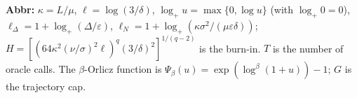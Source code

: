\begin{table}[tp]
\begin{threeparttable}
\begin{tablenotes}[flushleft]
\item[] \textbf{Abbr:} $\kappa=L/\mu$, $\ell=\log(3/\delta)$, $\log_+u=\max\{0,\log u\}$ (with $\log_+0=0$), $\ell_\Delta=1+\log_+(\Delta/\varepsilon)$, $\ell_N=1+\log_+(\kappa\sigma^2/(\mu\varepsilon\delta))$; $H=[(64\kappa^2(\nu/\sigma)^2\ell)^q(3/\delta)^2]^{1/(q-2)}$ is the burn-in. $T$ is the number of oracle calls. The $\beta$-Orlicz function is $\Psi_\beta(u)=\exp(\log^\beta(1+u))-1$; $G$ is the trajectory cap.
\end{tablenotes}
\end{threeparttable}
\end{table}
\clearpage
